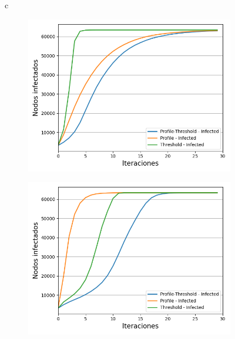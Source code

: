 \documentclass{article}
\begin{document}
\begin{figure}{c}
\begin{subfigure}[b]{0.5\textwidth}
		\includegraphics[width=\textwidth]{../Images/Fig 4 c).png}
		\caption{}
		\label{fig:f43}
	\end{subfigure}
	\hfill
	\begin{subfigure}[b]{0.5\textwidth}
		\includegraphics[width=\textwidth]{../Images/Fig 4 d).png}
		\caption{}
		\label{fig:f44}
	\end{subfigure}
	\hfil
	\begin{subfigure}[b]{0.5\textwidth}

\end{subfigure}
\end{figure}
\end{document}

